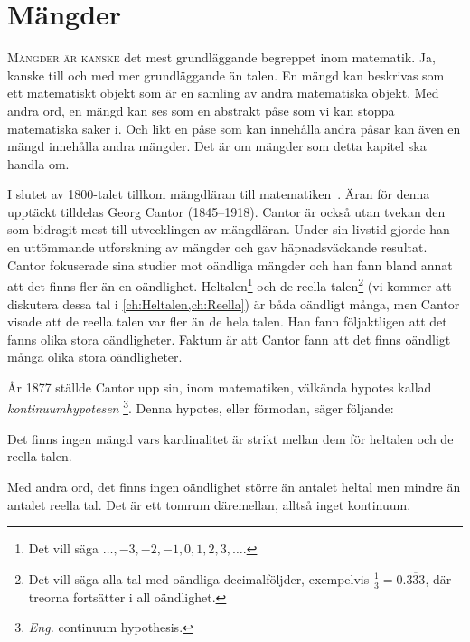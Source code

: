 \chapter{Mängder}%
\label{ch:Mangder}%
\lettrine{M}{ängder är kanske} det mest grundläggande begreppet inom matematik.
Ja, kanske till och med mer grundläggande än talen.
En mängd kan beskrivas som ett matematiskt objekt som är en samling av andra
matematiska objekt.
Med andra ord, en mängd kan ses som en abstrakt påse som vi kan stoppa
matematiska saker i.
Och likt en påse som kan innehålla andra påsar kan även en mängd
innehålla andra mängder.
Det är om mängder som detta kapitel ska handla om.

I slutet av 1800-talet tillkom mängdläran till 
matematiken~\cite{Kline1990mtf3}.
Äran för denna upptäckt tilldelas Georg Cantor (1845--1918).
Cantor är också utan tvekan den som bidragit mest till utvecklingen av
mängdläran.
Under sin livstid gjorde han en uttömmande utforskning av mängder och gav
häpnadsväckande resultat.
Cantor fokuserade sina studier mot oändliga mängder och han fann bland annat
att det finns fler än en oändlighet.
Heltalen\footnote{%
  Det vill säga \(\dotsc, -3, -2, -1, 0, 1, 2, 3, \dotsc\).
} och de reella talen\footnote{%
  Det vill säga alla tal med oändliga decimalföljder, exempelvis \(\frac{1}{3} 
    = 0.\overline{333}\), där treorna fortsätter i all oändlighet.
} (vi kommer att diskutera dessa tal i \cref{ch:Heltalen,ch:Reella}) är båda 
oändligt många, men Cantor visade att de reella talen var fler än de hela 
talen.
Han fann följaktligen att det fanns olika stora oändligheter.
Faktum är att Cantor fann att det finns oändligt många olika stora 
oändligheter.

År 1877 ställde Cantor upp sin, inom matematiken, välkända hypotes kallad
\emph{kontinuumhypotesen}%
%
\footnote{\emph{Eng.} continuum hypothesis.}.
Denna hypotes, eller förmodan, säger följande:
\begin{conjecture}[Kontinuumhypotesen]\label{Kontinuumhypotesen}
  Det finns ingen mängd vars kardinalitet är strikt mellan dem för heltalen
  och de reella talen.
\end{conjecture}
Med andra ord, det finns ingen oändlighet större än antalet heltal men mindre
än antalet reella tal.
Det är ett tomrum däremellan, alltså inget kontinuum.

